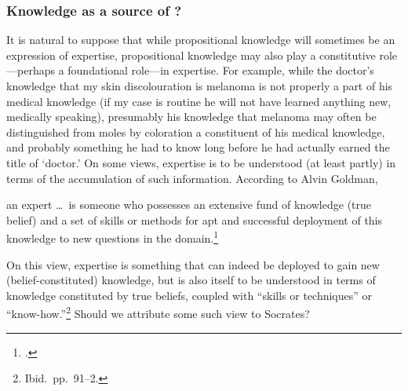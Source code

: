 \documentclass[11pt,letterpaper,oneside]{amsart} %
\begin{document}





\subsubsection*{Knowledge as a source of \techne?}

It is natural to suppose that while propositional knowledge will sometimes be an expression of expertise, propositional knowledge may also play a constitutive role---perhaps a foundational role---in expertise. For example, while the doctor's knowledge that my skin discolouration is melanoma is not properly a part of his medical knowledge (if my case is routine he will not have learned anything new, medically speaking), presumably his knowledge that melanoma may often be distinguished from moles by coloration  a constituent of his medical knowledge, and probably something he had to know long before he had actually earned the title of `doctor.' On some views, expertise is to be understood (at least partly) in terms of the accumulation of such information. According to Alvin Goldman,\begin{squote}an expert \ldots\ is someone who possesses an extensive fund of knowledge (true belief) and a set of skills or methods for apt and successful deployment of this knowledge to new questions in the domain.\footnote{\citet[p.\ 92]{goldman2001experts}.}\end{squote} On this view, expertise is something that can indeed be deployed to gain new (belief-constituted) knowledge, but is also itself to be understood in terms of knowledge constituted by true beliefs, coupled with ``skills or techniques'' or ``know-how.''\footnote{Ibid.\ pp.\ 91--2.} Should we attribute some such view to Socrates?
\end{document}

